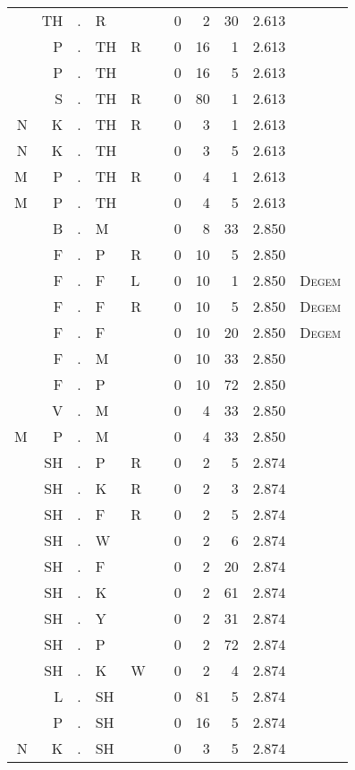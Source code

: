 \begin{longtable}{r@{ } r@{ } c@{ } l@{ } l@{ } l@{ } r r r r l }
  & TH & . & R &   &   & 0 & 2 & 30 & 2.613 &  \\
  & P & . & TH & R &   & 0 & 16 & 1 & 2.613 &  \\
  & P & . & TH &   &   & 0 & 16 & 5 & 2.613 &  \\
  & S & . & TH & R &   & 0 & 80 & 1 & 2.613 &  \\
N & K & . & TH & R &   & 0 & 3 & 1 & 2.613 &  \\
N & K & . & TH &   &   & 0 & 3 & 5 & 2.613 &  \\
M & P & . & TH & R &   & 0 & 4 & 1 & 2.613 &  \\
M & P & . & TH &   &   & 0 & 4 & 5 & 2.613 &  \\
  & B & . & M &   &   & 0 & 8 & 33 & 2.850 &  \\
  & F & . & P & R &   & 0 & 10 & 5 & 2.850 &  \\
  & F & . & F & L &   & 0 & 10 & 1 & 2.850 & \textsc{Degem} \\
  & F & . & F & R &   & 0 & 10 & 5 & 2.850 & \textsc{Degem} \\
  & F & . & F &   &   & 0 & 10 & 20 & 2.850 & \textsc{Degem} \\
  & F & . & M &   &   & 0 & 10 & 33 & 2.850 &  \\
  & F & . & P &   &   & 0 & 10 & 72 & 2.850 &  \\
  & V & . & M &   &   & 0 & 4 & 33 & 2.850 &  \\
M & P & . & M &   &   & 0 & 4 & 33 & 2.850 &  \\
  & SH & . & P & R &   & 0 & 2 & 5 & 2.874 &  \\
  & SH & . & K & R &   & 0 & 2 & 3 & 2.874 &  \\
  & SH & . & F & R &   & 0 & 2 & 5 & 2.874 &  \\
  & SH & . & W &   &   & 0 & 2 & 6 & 2.874 &  \\
  & SH & . & F &   &   & 0 & 2 & 20 & 2.874 &  \\
  & SH & . & K &   &   & 0 & 2 & 61 & 2.874 &  \\
  & SH & . & Y &   &   & 0 & 2 & 31 & 2.874 &  \\
  & SH & . & P &   &   & 0 & 2 & 72 & 2.874 &  \\
  & SH & . & K & W &   & 0 & 2 & 4 & 2.874 &  \\
  & L & . & SH &   &   & 0 & 81 & 5 & 2.874 &  \\
  & P & . & SH &   &   & 0 & 16 & 5 & 2.874 &  \\
N & K & . & SH &   &   & 0 & 3 & 5 & 2.874 &  \\

\end{longtable}
